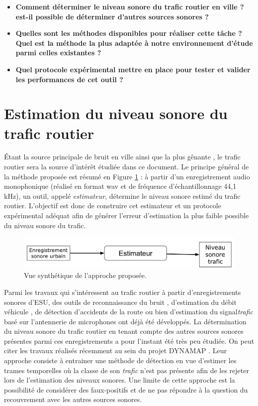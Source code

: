 \begin{itemize}
\item \textbf{Comment déterminer le niveau sonore du trafic routier en ville ? est-il possible de déterminer d'autres sources sonores ?}
\item \textbf{Quelles sont les méthodes disponibles pour réaliser cette tâche ? Quel est la méthode la plus adaptée à notre environnement d'étude parmi celles existantes ?}
\item \textbf{Quel protocole expérimental mettre en place pour tester et valider les performances de cet outil ?}
\end{itemize}

\section{Estimation du niveau sonore du trafic routier} \label{part:cahier_charges}

Étant la source principale de bruit en ville ainsi que la plus gênante \cite{noauthor_noise_nodate}, le trafic routier sera la source d'intérêt étudiée dans ce document. Le principe général de la méthode proposée est résumé en Figure \ref{fig:estimateur0} : à partir d'un enregistrement audio monophonique (réalisé en format wav et de fréquence d'échantillonnage 44,1 kHz), un outil, appelé \textit{estimateur}, détermine le niveau sonore estimé du trafic routier.
L'objectif est donc de construire cet estimateur et un protocole expérimental adéquat afin de générer l'erreur d'estimation la plus faible possible du niveau sonore du trafic.\\

\begin{figure}[ht]
\centering
\includegraphics[width=0.7\linewidth]{./figures/NMF/bloc_diagram_estimateur0.pdf}
\caption{Vue synthétique de l'approche proposée.}
\label{fig:estimateur0}
\end{figure}

Parmi les travaux qui s'intéressent au trafic routier à partir d'enregistrements sonores d'ESU,  des outils de reconnaissance du bruit \cite{defreville_automatic_2006}, d'estimation du débit véhicule \cite{torija2012using}, de détection d'accidents de la route \cite{harlow2001automated} ou bien d'estimation du signal\textit{trafic} basé sur l'antennerie de microphones \cite{leiba2017large} ont déjà été développés.
La détermination du niveau sonore du trafic routier en tenant compte des autres sources sonores présentes parmi ces enregistrements a pour l'instant été très peu étudiée. On peut citer les travaux réalisés récemment au sein du projet DYNAMAP \cite{socoro2017anomalous}. Leur approche consiste à entrainer une méthode de détection en vue d'estimer les trames temporelles où la classe de son \textit{trafic} n'est pas présente afin de les rejeter lors de l'estimation des niveaux sonores. Une limite de cette approche est la possibilité de considérer des faux-positifs et de ne pas répondre à la question du recouvrement avec les autres sources sonores.


